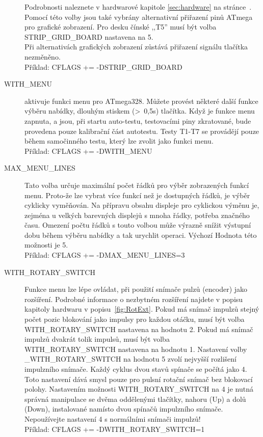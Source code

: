 \begin{description}
Podrobnosti naleznete v hardwarové kapitole \ref{sec:hardware} na stránce~\pageref{sec:hardware}.
Pomocí této volby jsou také vybrány alternativní přiřazení pinů ATmega pro grafické zobrazení.
Pro desku čínské ,,T5'' musí být volba  STRIP\_GRID\_BOARD nastavena na 5.\\
Při alternativách grafických zobrazení zůstává přiřazení signálu tlačítka nezměněno.\\
Příklad: CFLAGS += -DSTRIP\_GRID\_BOARD
  \item[WITH\_MENU] aktivuje funkci menu pro ATmega328. Můžete provést některé další funkce 
výběru nabídky, dlouhým stiskem (\textgreater~0,5s) tlačítka.
Když je funkce menu zapnuta, a jsou, při startu auto-testu, testovacími piny zkratované,
bude provedena pouze kalibrační část autotestu.
Testy T1-T7 se provádějí pouze během samočinného testu, který lze zvolit jako funkci menu.\\
Příklad: CFLAGS += -DWITH\_MENU
 \item[MAX\_MENU\_LINES]
Tato volba určuje maximální počet řádků pro výběr zobrazených funkcí menu.
Proto-že lze vybrat více funkcí než je dostupných řádků, je výběr cyklicky vyměňován.
Na přípravu obsahu displeje pro cyklickou výměnu je, zejména u velkých barevných displejů
s mnoha řádky, potřeba značného času.
Omezení počtu řádků s touto volbou může výrazně snížit výstupní dobu během výběru nabídky
a tak urychlit operaci.
Výchozí Hodnota této možnosti je 5.\\
Příklad: CFLAGS += -DMAX\_MENU\_LINES=3
  \item[WITH\_ROTARY\_SWITCH]  Funkce menu lze lépe ovládat, při použití snímače pulzů (encoder) jako rozšíření.
Podrobné informace o nezbytném rozšíření najdete v popisu kapitoly hardwaru v popisu~\ref{fig:RotExt}.
Pokud má snímač impulzů stejný počet pozic blokování jako impulsy pro každou otáčku, musí být
volba WITH\_ROTARY\_SWITCH nastavena na hodnotu 2.
Pokud má snímač impulzů dvakrát tolik impulsů, musí být volba WITH\_ROTARY\_SWITCH nastavena na hodnotu 1.
Nastavení volby \_WITH\_ROTARY\_SWITCH na hodnotu 5 zvolí nejvyšší rozlišení impulzního snímače.
Každý cyklus dvou stavů spínače se počítá jako 4.
Toto nastavení  dává smysl pouze pro pulsní rotační snímač bez blokovací polohy.
Nastavením možnosti WITH\_ROTARY\_SWITCH na 4 je nutná správná manipulace se dvěma oddělenými
tlačítky, nahoru (Up) a dolů (Down), instalované namísto dvou spínačů impulzního snímače.
Nepoužívejte nastavení 4 s normálními snímači impulzů!\\
Příklad: CFLAGS += -DWITH\_ROTARY\_SWITCH=1

\end{description}
